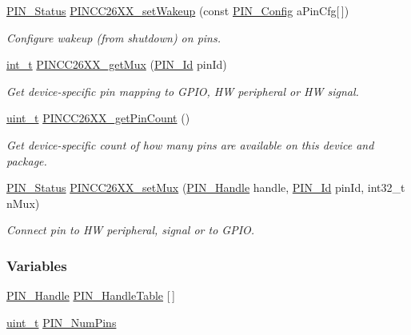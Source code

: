 \begin{DoxyCompactItemize}
\hyperlink{_p_i_n_8h_abe0ad59bbf09e51fe37195a5e70b23f6}{P\+I\+N\+\_\+\+Status} \hyperlink{_p_i_n_c_c26_x_x_8h_a7eea7460f3e2d4c68df55239471805aa}{P\+I\+N\+C\+C26\+X\+X\+\_\+set\+Wakeup} (const \hyperlink{_p_i_n_8h_ae427b7d2925f9b0f3145e455cfdb5841}{P\+I\+N\+\_\+\+Config} a\+Pin\+Cfg\mbox{[}$\,$\mbox{]})
\begin{DoxyCompactList}\small\item\em Configure wakeup (from shutdown) on pins. \end{DoxyCompactList}\item 
\hyperlink{_p_i_n_8h_ab6fd6105e64ed14a0c9281326f05e623}{int\+\_\+t} \hyperlink{_p_i_n_c_c26_x_x_8h_a568b24bc5bf40ce5f525be32a67c969a}{P\+I\+N\+C\+C26\+X\+X\+\_\+get\+Mux} (\hyperlink{_p_i_n_8h_a9ae8197f460bb76ea09a84f47d09921f}{P\+I\+N\+\_\+\+Id} pin\+Id)
\begin{DoxyCompactList}\small\item\em Get device-\/specific pin mapping to G\+P\+I\+O, H\+W peripheral or H\+W signal. \end{DoxyCompactList}\item 
\hyperlink{_p_i_n_8h_a12a1e9b3ce141648783a82445d02b58d}{uint\+\_\+t} \hyperlink{_p_i_n_c_c26_x_x_8h_aaacad5683f4594c19c4c2d23d5d1e6a2}{P\+I\+N\+C\+C26\+X\+X\+\_\+get\+Pin\+Count} ()
\begin{DoxyCompactList}\small\item\em Get device-\/specific count of how many pins are available on this device and package. \end{DoxyCompactList}\item 
\hyperlink{_p_i_n_8h_abe0ad59bbf09e51fe37195a5e70b23f6}{P\+I\+N\+\_\+\+Status} \hyperlink{_p_i_n_c_c26_x_x_8h_ac8cbb649db80dd03d8e8a487aef43294}{P\+I\+N\+C\+C26\+X\+X\+\_\+set\+Mux} (\hyperlink{_p_i_n_8h_afb2de52b054638f63c39df1f30a0d88d}{P\+I\+N\+\_\+\+Handle} handle, \hyperlink{_p_i_n_8h_a9ae8197f460bb76ea09a84f47d09921f}{P\+I\+N\+\_\+\+Id} pin\+Id, int32\+\_\+t n\+Mux)
\begin{DoxyCompactList}\small\item\em Connect pin to H\+W peripheral, signal or to G\+P\+I\+O. \end{DoxyCompactList}\end{DoxyCompactItemize}
\subsubsection*{Variables}
\begin{DoxyCompactItemize}
\item 
\hyperlink{_p_i_n_8h_afb2de52b054638f63c39df1f30a0d88d}{P\+I\+N\+\_\+\+Handle} \hyperlink{_p_i_n_c_c26_x_x_8h_a29e70a78c6a3f320797dc1db539988ac}{P\+I\+N\+\_\+\+Handle\+Table} \mbox{[}$\,$\mbox{]}
\item 
\hyperlink{_p_i_n_8h_a12a1e9b3ce141648783a82445d02b58d}{uint\+\_\+t} \hyperlink{_p_i_n_c_c26_x_x_8h_a138463d5bac2d11077c400c268491136}{P\+I\+N\+\_\+\+Num\+Pins}
\end{DoxyCompactItemize}


